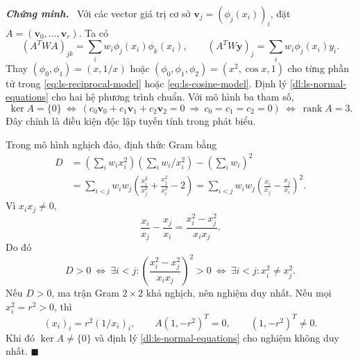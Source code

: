 \documentclass[12pt,a4paper,oneside]{book}
\numberwithin{algorithm}{chapter}
\theoremstyle{definition}
\newenvironment{chungminh}{\par\medskip\noindent\textbf{\textit{\color{mainblue}Chứng minh.}}\ }{\hfill$\blacksquare$\par\medskip}
\begin{document}
\begin{chungminh}
Với các vector giá trị cơ sở $\mathbf v_j=(\phi_j(x_i))_i$, đặt $A=(\mathbf v_0,\ldots,\mathbf v_r)$. Ta có
\[
 (A^TWA)_{jk}=\sum_iw_i\phi_j(x_i)\phi_k(x_i),\qquad
 (A^TW\boldsymbol y)_j=\sum_iw_i\phi_j(x_i)y_i.
\]
Thay $(\phi_0,\phi_1)=(x,1/x)$ hoặc $(\phi_0,\phi_1,\phi_2)=(x^2,\cos x,1)$ cho từng phần tử trong \eqref{eq:ls-reciprocal-model} hoặc \eqref{eq:ls-cosine-model}. Định lý \ref{dl:ls-normal-equations} cho hai hệ phương trình chuẩn.
Với mô hình ba tham số,
\[
 \ker A=\{0\}
 \ \Longleftrightarrow\
 \left(c_0\mathbf v_0+c_1\mathbf v_1+c_2\mathbf v_2=0
       \ \Longrightarrow\ c_0=c_1=c_2=0\right)
 \ \Longleftrightarrow\ \operatorname{rank}A=3.
\]
Đây chính là điều kiện độc lập tuyến tính trong phát biểu.

Trong mô hình nghịch đảo, định thức Gram bằng
\begin{align*}
 D&=\left(\sum_iw_ix_i^2\right)\left(\sum_iw_i/x_i^2\right)
       -\left(\sum_iw_i\right)^2\\
  &=\sum_{i<j}w_iw_j\left(\frac{x_i^2}{x_j^2}+
                          \frac{x_j^2}{x_i^2}-2\right)
   =\sum_{i<j}w_iw_j\left(\frac{x_i}{x_j}-\frac{x_j}{x_i}\right)^2.
\end{align*}
Vì $x_ix_j\ne0$,
\[
 \frac{x_i}{x_j}-\frac{x_j}{x_i}
 =\frac{x_i^2-x_j^2}{x_ix_j}.
\]
Do đó
\[
 D>0
 \ \Longleftrightarrow\
 \exists i<j:\left(\frac{x_i^2-x_j^2}{x_ix_j}\right)^2>0
 \ \Longleftrightarrow\
 \exists i<j:x_i^2\ne x_j^2.
\]
Nếu $D>0$, ma trận Gram $2\times2$ khả nghịch, nên nghiệm duy nhất. Nếu mọi $x_i^2=r^2>0$, thì
\[
 (x_i)_i=r^2(1/x_i)_i,\qquad
 A(1,-r^2)^T=0,\qquad (1,-r^2)^T\ne0.
\]
Khi đó $\ker A\ne\{0\}$ và định lý \ref{dl:ls-normal-equations} cho nghiệm không duy nhất.
\end{chungminh}

\end{document}
